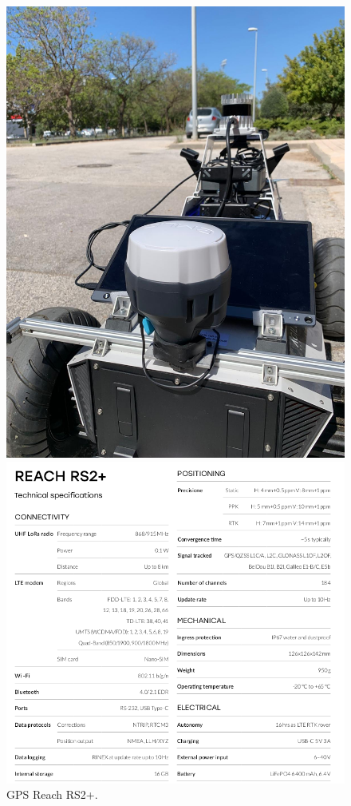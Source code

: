 \begin{figure}[htbp]
  \centering
  \begin{minipage}[b]{0.35\textwidth}
    \centering
    \includegraphics[width=\textwidth]{images/reach_rs2.jpeg}
    \caption{GPS Reach RS2+.}
    \label{fig:reach_rs2}
  \end{minipage}
  \hfill
  \begin{minipage}[b]{0.5\textwidth}
    \centering
    \includegraphics[width=\textwidth]{images/reach_datasheet.png}

\end{minipage}
\end{figure}
